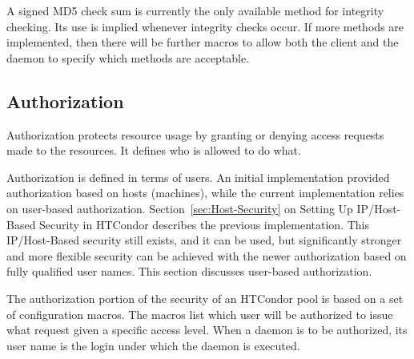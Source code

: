 A signed MD5 check sum is currently the only available method
for integrity checking.
Its use is implied whenever integrity checks occur.
If more methods are implemented, then there will be further
macros to allow both the client and the daemon to specify
which methods are acceptable.

\subsection{\label{sec:Security-Authorization}Authorization}

Authorization protects resource usage by granting or denying
access requests made to the resources.
It defines who is allowed to do what.

Authorization is defined in terms of users.
An initial implementation provided authorization
based on hosts (machines), while the current implementation
relies on user-based authorization.
Section~\ref{sec:Host-Security}
on Setting Up IP/Host-Based Security in HTCondor describes the
previous implementation.
This IP/Host-Based security still exists, and it can be used,
but significantly stronger and more flexible
security can be achieved with the newer
authorization based on fully qualified user names.
This section discusses user-based authorization. 


The authorization portion of the security of an HTCondor pool is
based on a set of configuration macros.
The macros list which user will be authorized
to issue what request given a specific access level.
When a daemon is to be authorized, its user name is the 
login under which the daemon is executed.

